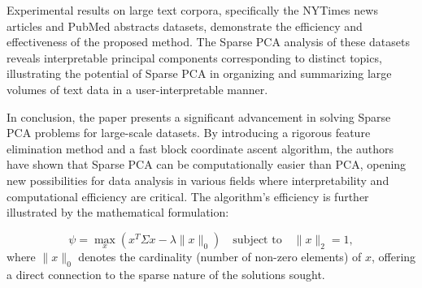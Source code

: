 \documentclass{article}
\begin{document}
Experimental results on large text corpora, specifically the NYTimes news articles and PubMed abstracts datasets, demonstrate the efficiency and effectiveness of the proposed method. The Sparse PCA analysis of these datasets reveals interpretable principal components corresponding to distinct topics, illustrating the potential of Sparse PCA in organizing and summarizing large volumes of text data in a user-interpretable manner.

In conclusion, the paper presents a significant advancement in solving Sparse PCA problems for large-scale datasets. By introducing a rigorous feature elimination method and a fast block coordinate ascent algorithm, the authors have shown that Sparse PCA can be computationally easier than PCA, opening new possibilities for data analysis in various fields where interpretability and computational efficiency are critical. The algorithm's efficiency is further illustrated by the mathematical formulation:

\begin{equation}
\psi = \max_{x} \left( x^T \Sigma x - \lambda \|x\|_0 \right) \quad \text{subject to} \quad \|x\|_2 = 1,
\end{equation}
where \(\|x\|_0\) denotes the cardinality (number of non-zero elements) of \(x\), offering a direct connection to the sparse nature of the solutions sought.
\end{document}
